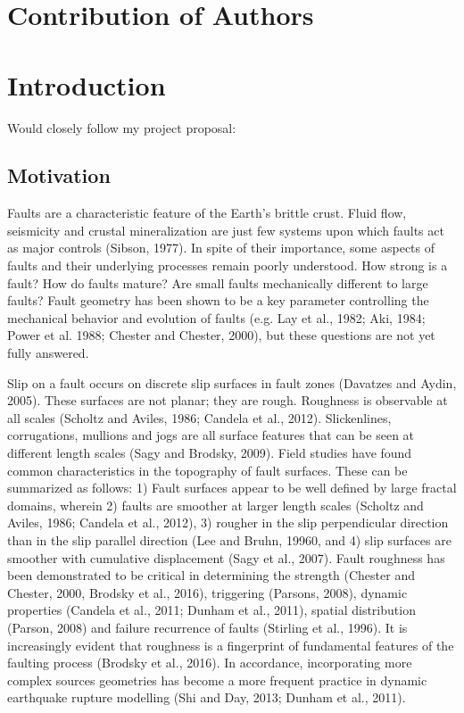 \documentclass[12pt,a4paper]{article}
\begin{document}
\section*{Contribution of Authors}

\section{Introduction}


Would closely follow my project proposal:

\subsection{Motivation}

Faults are a characteristic feature of the Earth’s brittle crust. Fluid flow, seismicity and crustal mineralization are just few systems upon which faults act as major controls (Sibson, 1977). In spite of their importance, some aspects of faults and their underlying processes remain poorly understood. How strong is a fault? How do faults mature? Are small faults mechanically different to large faults? Fault geometry has been shown to be a key parameter controlling the mechanical behavior and evolution of faults (e.g. Lay et al., 1982; Aki, 1984; Power et al. 1988; Chester and Chester, 2000), but these questions are not yet fully answered.

Slip on a fault occurs on discrete slip surfaces in fault zones (Davatzes and Aydin, 2005). These surfaces are not planar; they are rough. Roughness is observable at all scales (Scholtz and Aviles, 1986; Candela et al., 2012). Slickenlines, corrugations, mullions and jogs are all  surface features that can be seen at different length scales (Sagy and Brodsky, 2009). Field studies have found common characteristics in the topography of fault surfaces. These can be summarized as follows: 1) Fault surfaces appear to be well defined by large fractal domains, wherein 2) faults are smoother at larger length scales (Scholtz and Aviles, 1986; Candela et al., 2012), 3) rougher in the slip perpendicular direction than in the slip parallel direction (Lee and Bruhn, 19960, and 4) slip surfaces are smoother with cumulative displacement (Sagy et al., 2007). Fault roughness has been demonstrated to be critical in determining the strength (Chester and Chester, 2000, Brodsky et al., 2016), triggering (Parsons, 2008), dynamic properties (Candela et al., 2011; Dunham et al., 2011), spatial distribution (Parson, 2008) and failure recurrence of faults (Stirling et al., 1996). It is increasingly evident that roughness is a fingerprint of fundamental features of the faulting process (Brodsky et al., 2016). In accordance, incorporating more complex sources geometries has become a more frequent practice in dynamic earthquake rupture modelling (Shi and Day, 2013; Dunham et al., 2011). 
\end{document}

